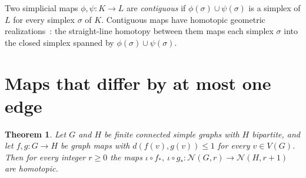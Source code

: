 \documentclass[11pt]{amsart}
\newtheorem{theorem}{Theorem}[section]
\theoremstyle{remark}
\newcommand{\N}{\mathcal{N}}
\begin{document}
Two simplicial maps $\phi,\psi\colon K\to L$ are \emph{contiguous} if $\phi(\sigma)\cup\psi(\sigma)$ is a simplex of $L$
for every simplex $\sigma$ of $K$. Contiguous maps have homotopic geometric realizations~\cite[Section~3.5]{Sp}: the straight-line homotopy between
them maps each simplex $\sigma$ into the closed simplex spanned by $\phi(\sigma)\cup\psi(\sigma)$.

\section{Maps that differ by at most one edge}

\begin{theorem}\label{thm:main}
Let $G$ and $H$ be finite connected simple graphs with $H$ bipartite, and let $f,g\colon G\to H$ be graph maps with
$d(f(v),g(v))\le1$ for every $v\in V(G)$. Then for every integer $r\ge0$ the maps
$\iota\circ f_*,\ \iota\circ g_*\colon\N(G,r)\to\N(H,r+1)$ are homotopic.
\end{theorem}
\end{document}
